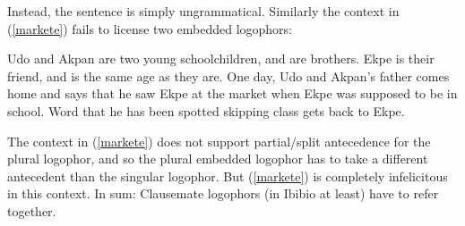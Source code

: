 \documentclass[output=paper]{langscibook}
\begin{document}
Instead, the sentence is simply ungrammatical. Similarly the context in (\ref{markete}) fails to license two embedded logophors:
\begin{context}
	Udo and Akpan are two young schoolchildren, and are brothers. Ekpe is their friend, and is the same age as they are. One day, Udo and Akpan's father comes home and says that he saw Ekpe at the market when Ekpe was supposed to be in school. Word that he has been spotted skipping class gets back to Ekpe.
	\end{context}
	\begin{exe}	
		\label{markete}	
\end{exe}
The context in (\ref{markete}) does not support partial/split antecedence for the plural logophor, and so the plural embedded logophor has to take a different antecedent than the singular logophor. But (\ref{markete}) is completely infelicitous in this context. In sum: Clausemate logophors (in Ibibio at least) have to refer together.\largerpage
\end{document}
